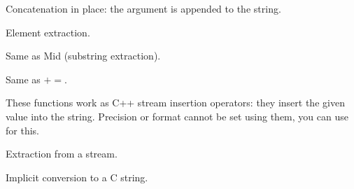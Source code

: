 
Concatenation in place: the argument is appended to the string.

\label{wxstringoperatorbracket}




Element extraction.

\label{wxstringoperatorparenth}


Same as Mid (substring extraction).

\label{wxstringoperatorout}




Same as $+=$.




These functions work as C++ stream insertion operators: they insert the given
value into the string. Precision or format cannot be set using them, you can use 
 for this.

\label{wxstringoperatorin}


Extraction from a stream.

\label{wxstringoperatorconstcharpt}


Implicit conversion to a C string.

\label{wxstringcomparison}

